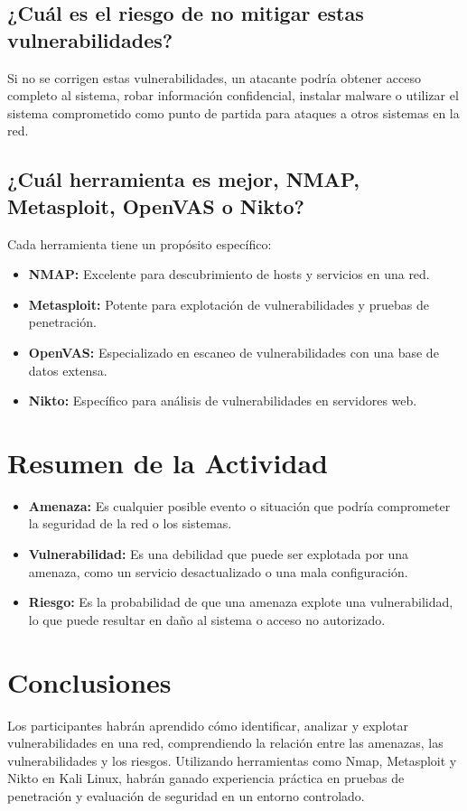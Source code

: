 \documentclass[12pt,a4paper]{article}
\begin{document}
\subsection{¿Cuál es el riesgo de no mitigar estas vulnerabilidades?}
Si no se corrigen estas vulnerabilidades, un atacante podría obtener acceso completo al sistema, robar información confidencial, instalar malware o utilizar el sistema comprometido como punto de partida para ataques a otros sistemas en la red.

\subsection{¿Cuál herramienta es mejor, NMAP, Metasploit, OpenVAS o Nikto?}
Cada herramienta tiene un propósito específico:
\begin{itemize}
    \item \textbf{NMAP:} Excelente para descubrimiento de hosts y servicios en una red.
    \item \textbf{Metasploit:} Potente para explotación de vulnerabilidades y pruebas de penetración.
    \item \textbf{OpenVAS:} Especializado en escaneo de vulnerabilidades con una base de datos extensa.
    \item \textbf{Nikto:} Específico para análisis de vulnerabilidades en servidores web.
\end{itemize}

\section{Resumen de la Actividad}
\begin{itemize}
    \item \textbf{Amenaza:} Es cualquier posible evento o situación que podría comprometer la seguridad de la red o los sistemas.
    \item \textbf{Vulnerabilidad:} Es una debilidad que puede ser explotada por una amenaza, como un servicio desactualizado o una mala configuración.
    \item \textbf{Riesgo:} Es la probabilidad de que una amenaza explote una vulnerabilidad, lo que puede resultar en daño al sistema o acceso no autorizado.
\end{itemize}

\section{Conclusiones}
Los participantes habrán aprendido cómo identificar, analizar y explotar vulnerabilidades en una red, comprendiendo la relación entre las amenazas, las vulnerabilidades y los riesgos. Utilizando herramientas como Nmap, Metasploit y Nikto en Kali Linux, habrán ganado experiencia práctica en pruebas de penetración y evaluación de seguridad en un entorno controlado.
\end{document}
